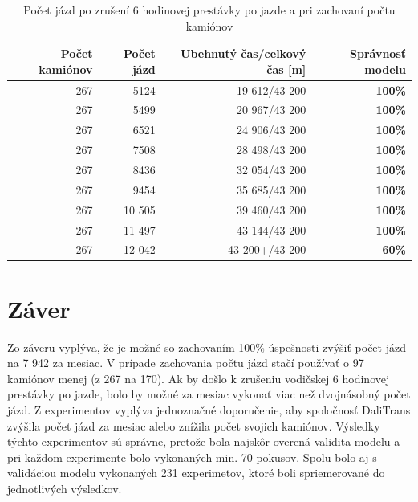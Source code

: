\documentclass[a4paper, 11pt]{article}
\begin{document}
    \begin{table}[ht]
		\centering
		\begin{tabular}{|r|r|r|r|}
			\hline
			Počet kamiónov & Počet jázd & Ubehnutý čas/celkový čas [m] & \textbf{Správnosť modelu} \\ \hline
			267 & 5124 & 19 612/43 200 &\textbf{100\%} \\ \hline
            267 & 5499 & 20 967/43 200 &\textbf{100\%} \\ \hline
            267 & 6521 & 24 906/43 200 &\textbf{100\%} \\ \hline
            267 & 7508 & 28 498/43 200 &\textbf{100\%} \\ \hline
            267 & 8436 & 32 054/43 200 &\textbf{100\%} \\ \hline
            267 & 9454 & 35 685/43 200 &\textbf{100\%} \\ \hline
            267 & 10 505 & 39 460/43 200 &\textbf{100\%} \\ \hline
            267 & 11 497 & 43 144/43 200 &\textbf{100\%} \\ \hline
            267 & 12 042 & 43 200+/43 200 &\textbf{60\%} \\ \hline
		\end{tabular}

		\caption{Počet jázd po zrušení 6 hodinovej prestávky po jazde a pri zachovaní počtu kamiónov}
		\label{table:4}
	\end{table}


    \clearpage
	\section{Záver}
	Zo záveru vyplýva, že je možné so zachovaním 100\% úspešnosti
    zvýšiť počet jázd na 7 942 za mesiac. V prípade zachovania počtu jázd
    stačí používať o 97 kamiónov menej (z 267 na 170). Ak by došlo
    k zrušeniu vodičskej 6 hodinovej prestávky po jazde, bolo by možné
    za mesiac vykonať viac než dvojnásobný počet jázd.\newline
    Z experimentov vyplýva jednoznačné doporučenie, aby spoločnosť
    DaliTrans zvýšila počet jázd za mesiac alebo znížila počet svojich
    kamiónov.\newline
    Výsledky týchto experimentov sú správne, pretože bola najskôr
    overená validita modelu a pri každom experimente bolo vykonaných min. 70 pokusov.
    Spolu bolo aj s validáciou modelu vykonaných 231 experimetov, ktoré boli
    spriemerované do jednotlivých výsledkov. 
\end{document}
